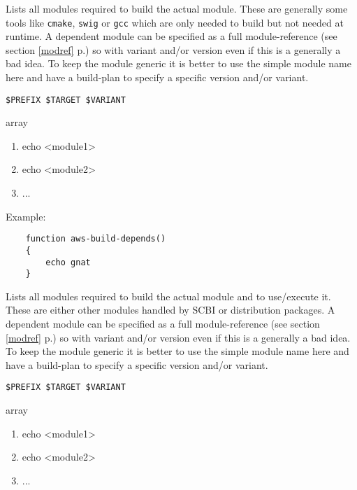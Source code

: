 \documentclass[a4paper,12pt,twoside]{article}
\newcommand{\code}[1]{\texttt{#1}}
\newcommand{\seeref}[1]{see section \ref{#1} p.\pageref{#1}}
\begin{document}
\begin{description}[font=\large\texttt]
	\item[<module>-{[}common|<variant>{]}-build-depends] Lists all modules required to build the actual module. These are generally some tools like \code{cmake}, \code{swig} or \code{gcc} which are only needed to build but not needed at runtime. A dependent module can be specified as a full module-reference (\seeref{modref}) so with variant and/or version even if this is a generally a bad idea. To keep the module generic it is better to use the simple module name here and have a build-plan to specify a specific version and/or variant.

	\begin{description}[font=\textit,style=standard]
		\item[parameter] \tabto{2cm} \code{\$PREFIX \$TARGET \$VARIANT}
		\item[return] \tabto{2cm} array
		\begin{enumerate}
			\item echo <module1>
			\item echo <module2>
			\item ...
		\end{enumerate}
	\end{description}

	Example:
	\begin{lstlisting}
	function aws-build-depends()
	{
		echo gnat
	}
	\end{lstlisting}

	\item[<module>-{[}common|<variant>{]}-depends] Lists all modules required to build the actual module and to use/execute it. These are either other modules handled by SCBI or distribution packages. A dependent module can be specified as a full module-reference (\seeref{modref}) so with variant and/or version even if this is a generally a bad idea. To keep the module generic it is better to use the simple module name here and have a build-plan to specify a specific version and/or variant.

	\begin{description}[font=\textit,style=standard]
		\item[parameter] \tabto{2cm} \code{\$PREFIX \$TARGET \$VARIANT}
		\item[return] \tabto{2cm} array
		\begin{enumerate}
			\item echo <module1>
			\item echo <module2>
			\item ...
		\end{enumerate}
	\end{description}


\end{description}
\end{document}
